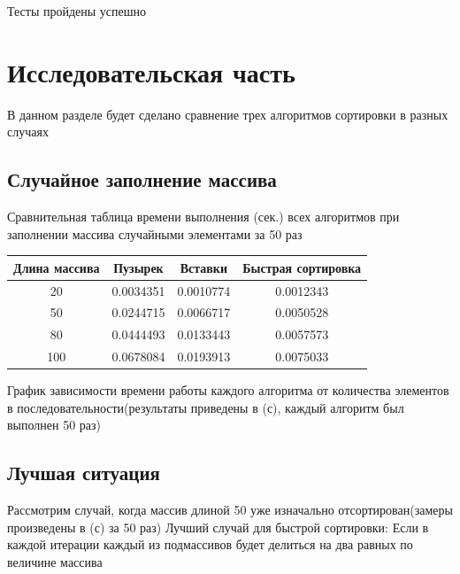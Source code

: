 \documentclass[12pt]{report}
\begin{document}
Тесты пройдены успешно

\chapter{Исследовательская часть}
В данном разделе будет сделано сравнение трех алгоритмов сортировки в разных случаях
\section{Случайное заполнение массива}
\begin{center}
	\centering
	\caption{Сравнительная таблица времени выполнения (сек.) всех алгоритмов при заполнении массива случайными элементами за 50 раз}
	\begin{tabular}{|c c c c|}
		\hline
		Длина массива & Пузырек & Вставки & Быстрая сортировка  \\ [0.5ex] 
 		\hline\hline
		20 & 0.0034351  & 0.0010774  & 0.0012343\\
 		\hline
 		50 & 0.0244715& 0.0066717 & 0.0050528\\
 		\hline
 		80 & 0.0444493  & 0.0133443 & 0.0057573  \\
 		\hline
		100 & 0.0678084  & 0.0193913 & 0.0075033 \\
		\hline
		\end{tabular}
\end{center}
\newpage
График зависимости времени работы каждого алгоритма от количества элементов в последовательности(результаты приведены в (с), каждый алгоритм был выполнен 50 раз)


\section{Лучшая ситуация}
Рассмотрим случай, когда массив длиной 50 уже изначально отсортирован(замеры произведены в (с) за 50 раз) \newline
Лучший случай для быстрой сортировки: Если в каждой итерации каждый из подмассивов будет делиться на два равных по величине массива\newline
\end{document}
